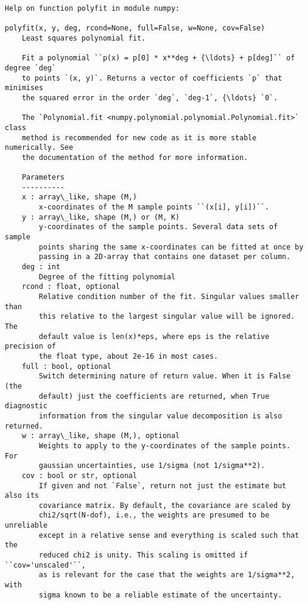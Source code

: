 \documentclass[11pt]{article}
\begin{document}
    \begin{Verbatim}[commandchars=\\\{\}]
Help on function polyfit in module numpy:

polyfit(x, y, deg, rcond=None, full=False, w=None, cov=False)
    Least squares polynomial fit.

    Fit a polynomial ``p(x) = p[0] * x**deg + {\ldots} + p[deg]`` of degree `deg`
    to points `(x, y)`. Returns a vector of coefficients `p` that minimises
    the squared error in the order `deg`, `deg-1`, {\ldots} `0`.

    The `Polynomial.fit <numpy.polynomial.polynomial.Polynomial.fit>` class
    method is recommended for new code as it is more stable numerically. See
    the documentation of the method for more information.

    Parameters
    ----------
    x : array\_like, shape (M,)
        x-coordinates of the M sample points ``(x[i], y[i])``.
    y : array\_like, shape (M,) or (M, K)
        y-coordinates of the sample points. Several data sets of sample
        points sharing the same x-coordinates can be fitted at once by
        passing in a 2D-array that contains one dataset per column.
    deg : int
        Degree of the fitting polynomial
    rcond : float, optional
        Relative condition number of the fit. Singular values smaller than
        this relative to the largest singular value will be ignored. The
        default value is len(x)*eps, where eps is the relative precision of
        the float type, about 2e-16 in most cases.
    full : bool, optional
        Switch determining nature of return value. When it is False (the
        default) just the coefficients are returned, when True diagnostic
        information from the singular value decomposition is also returned.
    w : array\_like, shape (M,), optional
        Weights to apply to the y-coordinates of the sample points. For
        gaussian uncertainties, use 1/sigma (not 1/sigma**2).
    cov : bool or str, optional
        If given and not `False`, return not just the estimate but also its
        covariance matrix. By default, the covariance are scaled by
        chi2/sqrt(N-dof), i.e., the weights are presumed to be unreliable
        except in a relative sense and everything is scaled such that the
        reduced chi2 is unity. This scaling is omitted if ``cov='unscaled'``,
        as is relevant for the case that the weights are 1/sigma**2, with
        sigma known to be a reliable estimate of the uncertainty.


\end{Verbatim}
\end{document}
